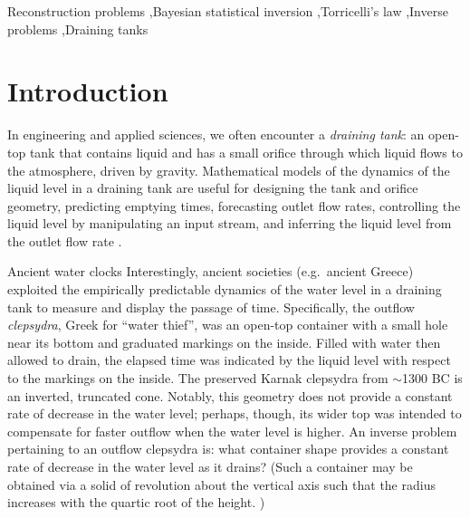 \documentclass[a4paper,fleqn]{cas-dc}
\begin{document}

\begin{keywords}
  Reconstruction problems \sep Bayesian statistical inversion \sep Torricelli's law \sep Inverse problems \sep Draining tanks
\end{keywords}

\maketitle


\section{Introduction}
In engineering and applied sciences, we often encounter a \emph{draining tank}:
an open-top tank that contains liquid and has a small orifice through which liquid flows to the atmosphere, driven by gravity.
Mathematical models of the dynamics of the liquid level in a draining tank are useful for designing the tank and orifice geometry, predicting emptying times, forecasting outlet flow rates, controlling the liquid level by manipulating an input stream, and inferring the liquid level from the outlet flow rate \cite{d2021torricelli,seborg2016process,groetsch1993inverse_tl,groetsch1999inverse}.

\begin{mytcbox}[label=box:waterclocks, breakable]{Ancient water clocks}
Interestingly, ancient societies (e.g.\ ancient Greece) exploited the empirically predictable dynamics of the water level in a draining tank to measure and display the passage of time.
Specifically, the outflow \emph{clepsydra}, Greek for ``water thief'', was an open-top container with a small hole near its bottom and graduated markings on the inside. 
Filled with water then allowed to drain, the elapsed time was indicated by the liquid level with respect to the markings on the inside. \cite{bedini1962compartmented,hwang2021historical,ritner2016oriental,hejun1987research,schomberg2018karnak,mills1982newton}
The preserved Karnak clepsydra from $\sim$1300 BC \cite{schomberg2018karnak} is an inverted, truncated cone. Notably, this geometry does not provide a constant rate of decrease in the water level; perhaps, though, its wider top was intended to compensate for faster outflow when the water level is higher. An inverse problem pertaining to an outflow clepsydra is: what container shape provides a constant rate of decrease in the water level as it drains?
(Such a container may be obtained via a solid of revolution about the vertical axis such that the radius increases with the quartic root of the height. \cite{mills1982newton,d2021torricelli})
\end{mytcbox}
\end{document}
